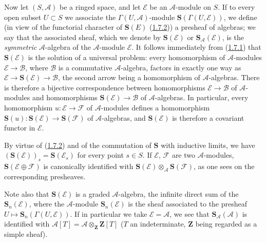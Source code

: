\begin{env}[1.7.4]
\label{II.1.7.4}
Now let $(S,\mathcal{A})$ be a ringed space, and let $\mathcal{E}$ be an
$\mathcal{A}$-module on $S$. If to every open subset $U\subset S$ we
associate the $\Gamma(U,\mathcal{A})$-module
$\mathbf{S}(\Gamma(U,\mathcal{E}))$, we define (in view of the functorial
character of $\mathbf{S}(E)$ (\hyperref[II.1.7.2]{1.7.2})) a presheaf of
algebras; we say that the associated sheaf, which we denote by
$\mathbf{S}(\mathcal{E})$ or $\mathbf{S}_{\mathcal{A}}(\mathcal{E})$, is
the \emph{symmetric} $\mathcal{A}$-algebra of the $\mathcal{A}$-module
$\mathcal{E}$. It follows immediately from (\hyperref[II.1.7.1]{1.7.1})
that $\mathbf{S}(\mathcal{E})$ is the solution of a universal problem:
every homomorphism of $\mathcal{A}$-modules
$\mathcal{E}\to\mathcal{B}$, where $\mathcal{B}$ is a commutative
$\mathcal{A}$-algebra, factors in exactly one way as
$\mathcal{E}\to\mathbf{S}(\mathcal{E})\to\mathcal{B}$, the second arrow
being a homomorphism of $\mathcal{A}$-algebras. There is therefore a
bijective correspondence between homomorphisms $\mathcal{E}\to\mathcal{B}$
of $\mathcal{A}$-modules and homomorphisms
$\mathbf{S}(\mathcal{E})\to\mathcal{B}$ of $\mathcal{A}$-algebras. In
particular, every homomorphism $u:\mathcal{E}\to\mathcal{F}$ of
$\mathcal{A}$-modules defines a homomorphism
$\mathbf{S}(u):\mathbf{S}(\mathcal{E})\to\mathbf{S}(\mathcal{F})$ of
$\mathcal{A}$-algebras, and $\mathbf{S}(\mathcal{E})$ is therefore a
covariant functor in $\mathcal{E}$.

By virtue of (\hyperref[II.1.7.2]{1.7.2}) and of the commutation of
$\mathbf{S}$ with inductive limits, we have
$(\mathbf{S}(\mathcal{E}))_s=\mathbf{S}(\mathcal{E}_s)$ for every point
$s\in S$. If $\mathcal{E}$, $\mathcal{F}$ are two $\mathcal{A}$-modules,
$\mathbf{S}(\mathcal{E}\oplus\mathcal{F})$ is canonically identified with
$\mathbf{S}(\mathcal{E})\otimes_{\mathcal{A}}\mathbf{S}(\mathcal{F})$,
as one sees on the corresponding presheaves.

Note also that $\mathbf{S}(\mathcal{E})$ is a graded $\mathcal{A}$-algebra,
the infinite direct sum of the $\mathbf{S}_n(\mathcal{E})$, where the
$\mathcal{A}$-module $\mathbf{S}_n(\mathcal{E})$ is the sheaf associated to
the presheaf $U\mapsto\mathbf{S}_n(\Gamma(U,\mathcal{E}))$. If in
particular we take $\mathcal{E}=\mathcal{A}$, we see that
$\mathbf{S}_{\mathcal{A}}(\mathcal{A})$ is identified with
$\mathcal{A}[T]=\mathcal{A}\otimes_{\mathbf{Z}}\mathbf{Z}[T]$
($T$ an indeterminate, $\mathbf{Z}$ being regarded as a simple sheaf).
\end{env}

